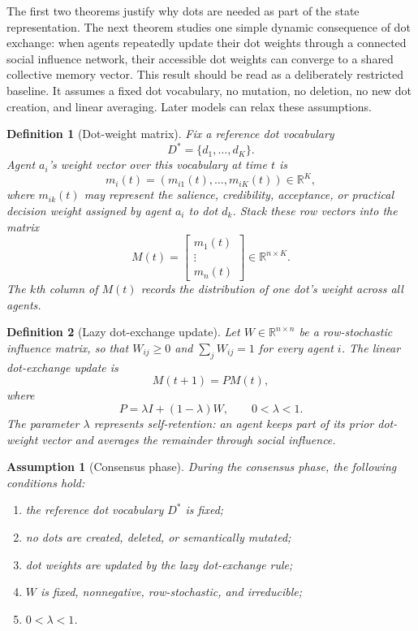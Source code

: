 \documentclass[11pt]{article}
\newtheorem{definition}{Definition}
\newtheorem{assumption}{Assumption}
\theoremstyle{remark}
\begin{document}
The first two theorems justify why dots are needed as part of the state
representation. The next theorem studies one simple dynamic consequence
of dot exchange: when agents repeatedly update their dot weights through
a connected social influence network, their accessible dot weights can
converge to a shared collective memory vector. This result should be
read as a deliberately restricted baseline. It assumes a fixed dot
vocabulary, no mutation, no deletion, no new dot creation, and linear
averaging. Later models can relax these assumptions.

\begin{definition}[Dot-weight matrix]
Fix a reference dot vocabulary
$$
D^*=\{d_1,\ldots,d_K\}.
$$
Agent $a_i$'s weight vector over this vocabulary at time $t$ is
$$
m_i(t)=(m_{i1}(t),\ldots,m_{iK}(t))\in \mathbb{R}^K,
$$
where $m_{ik}(t)$ may represent the salience, credibility, acceptance,
or practical decision weight assigned by agent $a_i$ to dot $d_k$. Stack
these row vectors into the matrix
$$
M(t)=
\begin{bmatrix}
 m_1(t) \\
 \vdots \\
 m_n(t)
\end{bmatrix}
\in \mathbb{R}^{n\times K}.
$$
The $k$th column of $M(t)$ records the distribution of one dot's weight
across all agents.
\end{definition}

\begin{definition}[Lazy dot-exchange update]
Let $W\in\mathbb{R}^{n\times n}$ be a row-stochastic influence matrix,
so that $W_{ij}\geq 0$ and $\sum_j W_{ij}=1$ for every agent $i$. The
linear dot-exchange update is
$$
M(t+1)=P M(t),
$$
where
$$
P=\lambda I+(1-\lambda)W,\qquad 0<\lambda<1.
$$
The parameter $\lambda$ represents self-retention: an agent keeps part
of its prior dot-weight vector and averages the remainder through social
influence.
\end{definition}

\begin{assumption}[Consensus phase]
During the consensus phase, the following conditions hold:
\begin{enumerate}[label=(C\arabic*)]
\item the reference dot vocabulary $D^*$ is fixed;
\item no dots are created, deleted, or semantically mutated;
\item dot weights are updated by the lazy dot-exchange rule;
\item $W$ is fixed, nonnegative, row-stochastic, and irreducible;
\item $0<\lambda<1$.
\end{enumerate}
\end{assumption}
\end{document}
